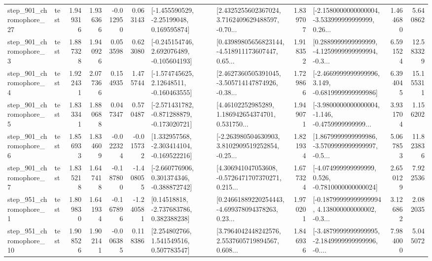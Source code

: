 \begin{tabular}{llrrrrllrlrr}
  step\_901\_chromophore\_27 &      test &      1.949316 &    1.936366 &     -0.012950 &  0.063143 &    [-1.455590529, -2.25199048, 0.169595874] &  [2.4325255602367024, 3.7162409629488597, -0.70... &       1.839707 &  [-2.1580000000000004, -3.533999999999999, 0.26... &            1.464680 &          5.640862 \\
   step\_901\_chromophore\_3 &      test &      1.887328 &    1.940926 &      0.053598 &  0.623080 &   [-0.245154746, 2.692076489, -0.105604193] &  [0.43989805656823144, -4.518911173607447, 0.65... &       1.918352 &  [0.2889999999999999, -4.1259999999999994, -0.3... &            6.591524 &         12.583329 \\
   step\_901\_chromophore\_4 &      test &      1.922431 &    2.077366 &      0.154935 &  1.475744 &    [-1.574745625, 2.12648511, -0.160463555] &  [2.4627360505391045, -3.505714147874926, -0.38... &       1.729866 &  [-2.4669999999999996, 3.149, -0.6819999999999986] &            6.394045 &         15.155311 \\
   step\_901\_chromophore\_5 &      test &      1.833341 &    1.880688 &      0.047347 &  0.570487 &  [-2.571431782, -0.871288879, -0.173020721] &  [4.46102252985289, 1.186942654374701, 0.531750... &       1.949071 &  [-3.9800000000000004, -1.146, -0.4759999999999... &            3.931704 &          1.156202 \\
   step\_901\_chromophore\_6 &      test &      1.856933 &    1.834609 &     -0.022324 & -0.015732 &   [1.332957568, -2.303414104, -0.169522216] &  [-2.263980504630903, 3.8102909519252854, -0.25... &       1.821934 &  [1.8679999999999986, -3.5709999999999997, -0.5... &            5.067853 &         11.823836 \\
   step\_901\_chromophore\_7 &      test &      1.835218 &    1.647418 &     -0.187800 & -1.408055 &   [-2.660776906, 0.301374346, -0.388872742] &  [4.306941047053608, -0.5726471707370271, 0.215... &       1.677324 &   [-4.074999999999999, 0.526, -0.7810000000000024] &            2.650129 &          7.922536 \\
   step\_951\_chromophore\_1 &      test &      1.809830 &    1.641934 &     -0.167896 & -1.240581 &     [0.14518818, -2.737683786, 0.382388238] &  [0.24661889220254443, -4.699378094378263, 0.23... &       1.970201 &  [-0.18799999999999994, 4.138000000000002, -0.3... &            3.126862 &          2.082035 \\
  step\_951\_chromophore\_10 &      test &      1.908526 &    1.902141 &     -0.006385 &  0.118386 &     [2.254802766, 1.541549516, 0.507783547] &  [3.7964042448242576, 2.5537605719894567, 0.608... &       1.846936 &  [-3.4879999999999995, -2.1849999999999996, -0.... &            7.984000 &          5.045072 \\

\end{tabular}
